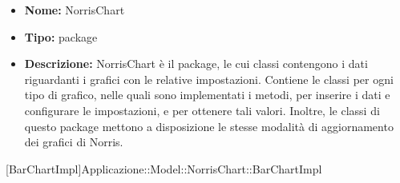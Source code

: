 			\begin{itemize}
			\item \textbf{Nome:} NorrisChart
			\item \textbf{Tipo:} package
			
			\item \textbf{Descrizione:} NorrisChart è il package, le cui classi contengono i dati riguardanti i grafici con le relative impostazioni. Contiene le classi per ogni tipo di grafico, nelle quali sono implementati i metodi, per inserire i dati e configurare le impostazioni, e per ottenere tali valori. Inoltre, le classi di questo package mettono a disposizione le stesse modalità di aggiornamento dei grafici di Norris.
			\end{itemize}

			
			[BarChartImpl]{Applicazione::Model::NorrisChart::BarChartImpl}
			

	
